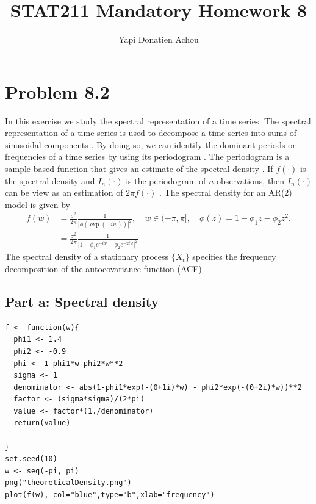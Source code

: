 \documentclass[11pt, oneside]{article}   	%
\title{STAT211 Mandatory Homework 8}
\author{Yapi Donatien Achou}
\begin{document}
\maketitle 
\tableofcontents
\newpage
 
 \section{Problem 8.2}
 In this exercise we study the spectral representation of a time series. The spectral representation of a time series is used to decompose a time series into sums of sinusoidal components \cite{petter}. By doing so, we can identify the dominant periods or frequencies of a time series by using its periodogram \cite{penn}. The periodogram is a sample based function that gives an estimate of the spectral density \cite{petter}. If $f(\cdot)$ is the spectral density and $I_{n}(\cdot)$ is the periodogram of $n$ observations, then $I_{n}(\cdot)$ can be view as an estimation of $2\pi f(\cdot)$ \cite{petter}.
\justify 
The spectral density for an AR(2) model is given by 
 \begin{equation}
 \begin{split}
 f(w) &= \frac{\sigma^{2}}{2\pi} \frac{1}{| \phi(\exp(-iw))|^{2}}, \quad w \in (-\pi, \pi], \quad \phi(z) = 1-\phi_{1}z - \phi_{2}z^{2}.\\
        &=\frac{\sigma^{2}}{2\pi} \frac{1}{|1-\phi_{1}e^{-iw} - \phi_{2}e^{-2iw} |^{2}}
 \end{split}
 \end{equation}
 The spectral density of a stationary process $\{X_{t}\}$ specifies the frequency decomposition of the autocovariance function (ACF) \cite{petter}.
 \subsection{Part a: Spectral density}
 \begin{lstlisting}
f <- function(w){
  phi1 <- 1.4
  phi2 <- -0.9
  phi <- 1-phi1*w-phi2*w**2
  sigma <- 1
  denominator <- abs(1-phi1*exp(-(0+1i)*w) - phi2*exp(-(0+2i)*w))**2
  factor <- (sigma*sigma)/(2*pi)
  value <- factor*(1./denominator)
  return(value)

}
set.seed(10)
w <- seq(-pi, pi)
png("theoreticalDensity.png")
plot(f(w), col="blue",type="b",xlab="frequency")
\end{lstlisting}
\end{document}
